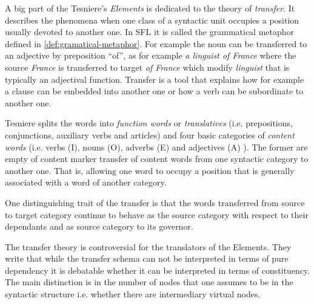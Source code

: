 A big part of the Tesniere's \textit{Elements} \citep{Tesniere59} is dedicated to the theory of \textit{transfer}. It describes the phenomena when one class of a syntactic unit occupies a position usually devoted to another one. In SFL it is called the grammatical metaphor defined in \ref{def:gramatical-metaphor}. For example the noun can be transferred to an adjective by preposition ``of'', as for example \textit{a linguist of France} where the source \textit{France} is transferred to target \textit{of France} which modify \textit{linguist} that is typically an adjectival function. Transfer is a tool that explains how for example a clause can be embedded into another one or how a verb can be subordinate to another one. 

Tesniere splits the words into \textit{function words} or \textit{translatives} (i.e. prepositions, conjunctions, auxiliary verbs and articles) and four basic categories of \textit{content words} (i.e. verbs (I), nouns (O), adverbs (E) and adjectives (A) ). The former are empty of content marker transfer of content words from one syntactic category to another one. That is, allowing one word to occupy a position that is generally associated with a word of another category. 

One distinguishing trait of the transfer is that the words transferred from source to target category continue to behave as the source category with respect to their dependants and as source category to its governor.

The transfer theory is controversial for the translators of the Elements. They write \citep[liv-lx]{Tesniere2015} that while the transfer schema can not be interpreted in terms of pure dependency it is debatable whether it can be interpreted in terms of constituency. The main distinction is in the number of nodes that one assumes to be in the syntactic structure i.e. whether there are intermediary virtual nodes. 


